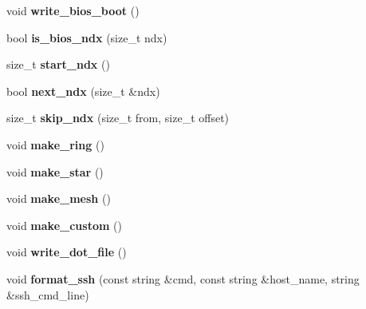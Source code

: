 \begin{DoxyCompactItemize}
\item 
\mbox{\label{structlauncher__def_a512b1b81132adb4d2c5ee0b680d276e9}} 
void {\bfseries write\+\_\+bios\+\_\+boot} ()
\item 
\mbox{\label{structlauncher__def_ac0e3968f40fee377535b9b5b0a063f47}} 
bool {\bfseries is\+\_\+bios\+\_\+ndx} (size\+\_\+t ndx)
\item 
\mbox{\label{structlauncher__def_a938ddf2e57d2b843911ff88678100ea1}} 
size\+\_\+t {\bfseries start\+\_\+ndx} ()
\item 
\mbox{\label{structlauncher__def_af994e3a4da3e0768833b3779707cf2e8}} 
bool {\bfseries next\+\_\+ndx} (size\+\_\+t \&ndx)
\item 
\mbox{\label{structlauncher__def_ad2a447983792ae923564a0e314d48cf5}} 
size\+\_\+t {\bfseries skip\+\_\+ndx} (size\+\_\+t from, size\+\_\+t offset)
\item 
\mbox{\label{structlauncher__def_ac600ca49796bfc3bd1c68e7ff58acab2}} 
void {\bfseries make\+\_\+ring} ()
\item 
\mbox{\label{structlauncher__def_a1830ff82f11b854218c383e032c678a7}} 
void {\bfseries make\+\_\+star} ()
\item 
\mbox{\label{structlauncher__def_a99c0d0530c0b48a76aa992524ec732ee}} 
void {\bfseries make\+\_\+mesh} ()
\item 
\mbox{\label{structlauncher__def_ae990fd816eed74dd05c7a2d35cbe4dc7}} 
void {\bfseries make\+\_\+custom} ()
\item 
\mbox{\label{structlauncher__def_a57dfb96440ba0b4874d921979179b6a3}} 
void {\bfseries write\+\_\+dot\+\_\+file} ()
\item 
\mbox{\label{structlauncher__def_af1b7d62253cacd97d1b757a5ff912bcf}} 
void {\bfseries format\+\_\+ssh} (const string \&cmd, const string \&host\+\_\+name, string \&ssh\+\_\+cmd\+\_\+line)

\end{DoxyCompactItemize}
